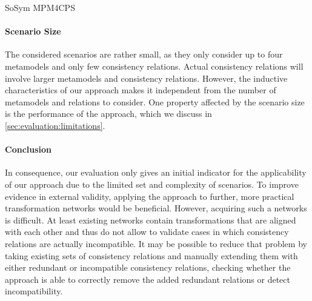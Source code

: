 \begin{copiedFrom}{SoSym MPM4CPS}
\paragraph{Scenario Size}
The considered scenarios are rather small, as they only consider up to four metamodels and only few consistency relations.
Actual consistency relations will involve larger metamodels and consistency relations.
However, the inductive characteristics of our approach makes it independent from the number of metamodels and relations to consider.
One property affected by the scenario size is the performance of the approach, which we discuss in \autoref{sec:evaluation:limitations}.




\paragraph{Conclusion}
In consequence, our evaluation only gives an initial indicator for the applicability of our approach due to the limited set and complexity of scenarios.
To improve evidence in external validity, applying the approach to further, more practical transformation networks would be beneficial.
However, acquiring such a networks is difficult.
At least existing networks contain transformations that are aligned with each other and thus do not allow to validate cases in which consistency relations are actually incompatible.
It may be possible to reduce that problem by taking existing sets of consistency relations and manually extending them with either redundant or incompatible consistency relations, checking whether the approach is able to correctly remove the added redundant relations or detect incompatibility.


\end{copiedFrom}

